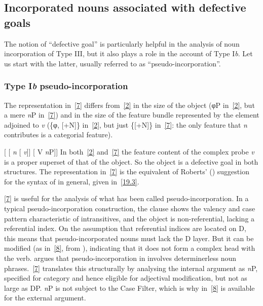 \documentclass[output=paper]{langsci/langscibook}
\begin{document}
\begin{refcontext}
\subsection{Incorporated nouns associated with defective goals}
\label{2.1}

The notion of \enquote{defective goal} is particularly helpful in the analysis of
noun incorporation of Type III, but it also plays a role in the account of Type
I\emph{b}. Let us start with the latter, usually referred to as
\enquote{pseudo-incorporation}.

\subsubsection{Type I\emph{b} pseudo-incorporation}

The representation in~\eqref{7} differs from~\eqref{2} in the size of the object (φ{}P in~\eqref{2}, but a mere \emph{n}P in~\eqref{7})
and in the size of the feature bundle represented by the element adjoined to \emph{v} (\{φ{}, [+N]\} in~\eqref{2}, but
just \{[+N]\} in~\eqref{7}: the only feature that \emph{n} contributes is a categorial feature).

\ea {}[ [ \emph{n}\tss{\{[+N]\}} [ \hspace{-1ex}\emph{v}\tss{\{[+V], \Acc{}, \ldots{}\}}]] [ V \emph{n}P\tss{\{[+N]\}}]] \label{7}
\z
In both~\eqref{2} and~\eqref{7} the feature content of the complex probe \emph{v}
is a proper superset of that of the object. So the object is a defective goal
in both structures. The representation in~\eqref{7} is the equivalent of Roberts'
(\citeyear{Roberts2010}) suggestion for the syntax of  in
general, given in~\eqref{19.3}.

\eqref{7} is useful for the analysis of what has been called
pseudo-incorporation. In a typical pseudo-incorporation construction, the
clause shows the valency and case pattern characteristic of intransitives, and
the object is non-referential, lacking a referential index. On the assumption
that referential indices are located on D, this means that pseudo-incorporated
nouns must lack the D layer. But it can be modified (as in~\eqref{8}, from
), indicating that it does not form a complex head with the verb.
\cite{massam01} argues that pseudo-incorporation in  involves
determinerless noun phrases.~\eqref{7} translates this structurally by analysing
the internal argument as \emph{n}P, specified for category and hence eligible
for adjectival modification, but not as large as DP. \emph{n}P is not subject
to the Case Filter, which is why in~\eqref{8}  is available for
the external argument.


\end{refcontext}
\end{document}
